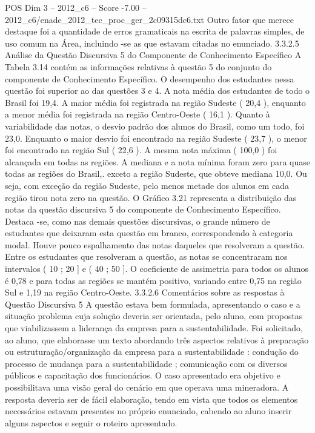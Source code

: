 \begin{textsample}{POS Dim 3 – 2012\_c6 – Score -7.00 – 2012\_c6/enade\_2012\_tec\_proc\_ger\_2c09315dc6.txt}
Outro fator que merece destaque foi a quantidade de erros gramaticais na escrita de palavras simples, de uso comum na Área, incluindo -se as que estavam citadas no enunciado. 3.3.2.5 Análise da Questão Discursiva 5 do Componente de Conhecimento Específico A Tabela 3.14 contém as informações relativas à questão 5 do conjunto do componente de Conhecimento Específico.
O desempenho dos estudantes nessa questão foi superior ao das questões 3 e 4.
A nota média dos estudantes de todo o Brasil foi 19,4.
A maior média foi registrada na região Sudeste ( 20,4 ), enquanto a menor média foi registrada na região Centro-Oeste ( 16,1 ).
Quanto à variabilidade das notas, o desvio padrão dos alunos do Brasil, como um todo, foi 23,0.
Enquanto o maior desvio foi encontrado na região Sudeste ( 23,7 ), o menor foi encontrado na região Sul ( 22,6 ).
A mesma nota máxima ( 100,0 ) foi alcançada em todas as regiões.
A mediana e a nota mínima foram zero para quase todas as regiões do Brasil,. exceto a região Sudeste, que obteve mediana 10,0.
Ou seja, com exceção da região Sudeste, pelo menos metade dos alunos em cada região tirou nota zero na questão.
O Gráfico 3.21 representa a distribuição das notas da questão discursiva 5 do componente de Conhecimento Específico.
Destaca -se, como nas demais questões discursivas, o grande número de estudantes que deixaram esta questão em branco, correspondendo à categoria modal.
Houve pouco espalhamento das notas daqueles que resolveram a questão.
Entre os estudantes que resolveram a questão, as notas se concentraram nos intervalos ( 10 ; 20 ] e ( 40 ; 50 ].
O coeficiente de assimetria para todos os alunos é 0,78 e para todas as regiões se mantém positivo, variando entre 0,75 na região Sul e 1,19 na região Centro-Oeste. 3.3.2.6 Comentários sobre as respostas à Questão Discursiva 5 A questão estava bem formulada, apresentando o caso e a situação problema cuja solução deveria ser orientada, pelo aluno, com propostas que viabilizassem a liderança da empresa para a sustentabilidade.
Foi solicitado, ao aluno, que elaborasse um texto abordando três aspectos relativos à preparação ou estruturação/organização da empresa para a sustentabilidade : condução do processo de mudança para a sustentabilidade ; comunicação com os diversos públicos e capacitação dos funcionários.
O caso apresentado era objetivo e possibilitava uma visão geral do cenário em que operava uma mineradora.
A resposta deveria ser de fácil elaboração, tendo em vista que todos os elementos necessários estavam presentes no próprio enunciado, cabendo ao aluno inserir alguns aspectos e seguir o roteiro apresentado.

\end{textsample}
